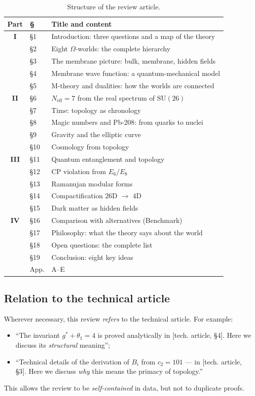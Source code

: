 \documentclass[11pt,a4paper]{article}
\newcommand{\SU}{\mathrm{SU}}
\newcommand{\Neff}{N_{\text{eff}}}
\theoremstyle{definition}
\begin{document}
\begin{table}[htbp]
\centering
\caption{Structure of the review article.}
\label{tab:structure}
\begin{tabular}{clp{7cm}}
\toprule
Part & § & Title and content \\
\midrule
\textbf{I} & §1 & Introduction: three questions and a map of the theory \\
 & §2 & Eight $\Omega$-worlds: the complete hierarchy \\
 & §3 & The membrane picture: bulk, membrane, hidden fields \\
 & §4 & Membrane wave function: a quantum-mechanical model \\
 & §5 & M-theory and dualities: how the worlds are connected \\
\midrule
\textbf{II} & §6 & $\Neff = 7$ from the real spectrum of $\SU(26)$ \\
 & §7 & Time: topology as chronology \\
 & §8 & Magic numbers and Pb-208: from quarks to nuclei \\
 & §9 & Gravity and the elliptic curve \\
 & §10 & Cosmology from topology \\
\midrule
\textbf{III} & §11 & Quantum entanglement and topology \\
 & §12 & CP violation from $E_6/E_8$ \\
 & §13 & Ramanujan modular forms \\
 & §14 & Compactification $26$D $\to$ $4$D \\
 & §15 & Dark matter as hidden fields \\
\midrule
\textbf{IV} & §16 & Comparison with alternatives (Benchmark) \\
 & §17 & Philosophy: what the theory says about the world \\
 & §18 & Open questions: the complete list \\
 & §19 & Conclusion: eight key ideas \\
 & App. & A--E \\
\bottomrule
\end{tabular}
\end{table}

\subsection{Relation to the technical article}

Wherever necessary, this review \emph{refers} to the 
technical article. For example:
\begin{itemize}
    \item ``The invariant $g^* + \theta_1 = 4$ is proved 
          analytically in [tech. article, §4]. Here we 
          discuss its \emph{structural} meaning'';
    \item ``Technical details of the derivation of $B_i$ from $c_2 = 101$ — 
          in [tech. article, §3]. Here we discuss \emph{why} 
          this means the primacy of topology.''
\end{itemize}
This allows the review to be \emph{self-contained} in data, 
but not to duplicate proofs.
\end{document}
